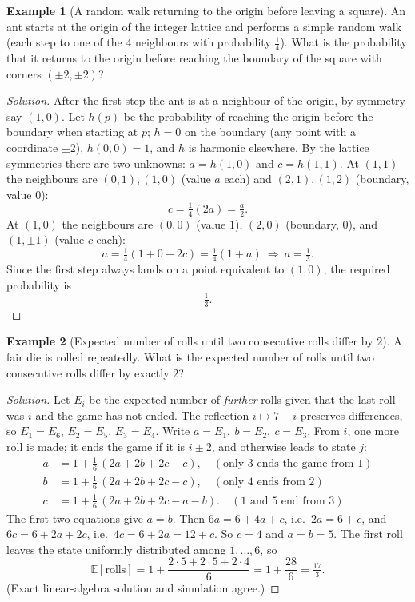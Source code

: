 \documentclass[11pt]{article}
\theoremstyle{definition}
\newtheorem{example}{Example}[section]
\newcommand{\E}{\mathbb{E}}
\begin{document}
\begin{example}[A random walk returning to the origin before leaving a square]
An ant starts at the origin of the integer lattice and performs a simple random walk (each step to one of the $4$ neighbours with probability $\tfrac14$). What is the probability that it returns to the origin before reaching the boundary of the square with corners $(\pm2,\pm2)$?
\end{example}

\begin{proof}[Solution]
After the first step the ant is at a neighbour of the origin, by symmetry say $(1,0)$. Let $h(p)$ be the probability of reaching the origin before the boundary when starting at $p$; $h=0$ on the boundary (any point with a coordinate $\pm2$), $h(0,0)=1$, and $h$ is harmonic elsewhere. By the lattice symmetries there are two unknowns: $a=h(1,0)$ and $c=h(1,1)$. At $(1,1)$ the neighbours are $(0,1),(1,0)$ (value $a$ each) and $(2,1),(1,2)$ (boundary, value $0$):
\[
c=\tfrac14(2a)=\tfrac a2 .
\]
At $(1,0)$ the neighbours are $(0,0)$ (value $1$), $(2,0)$ (boundary, $0$), and $(1,\pm1)$ (value $c$ each):
\[
a=\tfrac14(1+0+2c)=\tfrac14(1+a)\ \Longrightarrow\ a=\tfrac13 .
\]
Since the first step always lands on a point equivalent to $(1,0)$, the required probability is
\[
\boxed{\tfrac13}.
\]
\end{proof}

\begin{example}[Expected number of rolls until two consecutive rolls differ by $2$]
A fair die is rolled repeatedly. What is the expected number of rolls until two consecutive rolls differ by exactly $2$?
\end{example}

\begin{proof}[Solution]
Let $E_i$ be the expected number of \emph{further} rolls given that the last roll was $i$ and the game has not ended. The reflection $i\mapsto7-i$ preserves differences, so $E_1=E_6$, $E_2=E_5$, $E_3=E_4$. Write $a=E_1,\ b=E_2,\ c=E_3$. From $i$, one more roll is made; it ends the game if it is $i\pm2$, and otherwise leads to state $j$:
\begin{align*}
a&=1+\tfrac16\,(2a+2b+2c-c),\quad(\text{only }3\text{ ends the game from }1)\\
b&=1+\tfrac16\,(2a+2b+2c-c),\quad(\text{only }4\text{ ends from }2)\\
c&=1+\tfrac16\,(2a+2b+2c-a-b).\quad(1\text{ and }5\text{ end from }3)
\end{align*}
The first two equations give $a=b$. Then $6a=6+4a+c$, i.e.\ $2a=6+c$, and $6c=6+2a+2c$, i.e.\ $4c=6+2a=12+c$. So $c=4$ and $a=b=5$. The first roll leaves the state uniformly distributed among $1,\dots,6$, so
\[
\E[\text{rolls}]=1+\frac{2\cdot5+2\cdot5+2\cdot4}6=1+\frac{28}6=\boxed{\tfrac{17}3}.
\]
(Exact linear-algebra solution and simulation agree.)
\end{proof}
\end{document}
